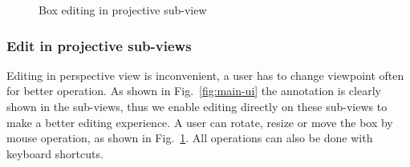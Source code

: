 \documentclass[letterpaper, 10 pt, conference]{ieeeconf}  %
\begin{document}
\begin{figure}[t]
	\centering
	\caption{Box editing in projective sub-view}
	\label{fig:box-mouse-edit-subview}
\end{figure}

\subsubsection{Edit in projective sub-views}
Editing in perspective view is inconvenient,  a user has to change viewpoint often for better operation. As shown in Fig.~\ref{fig:main-ui} the annotation is clearly shown in the sub-views, thus we enable editing directly on these sub-views to make a better editing experience. A user can rotate, resize or move the box by mouse operation, as shown in Fig.~\ref{fig:box-mouse-edit-subview}.
All operations can also be done with keyboard shortcuts.
\end{document}
